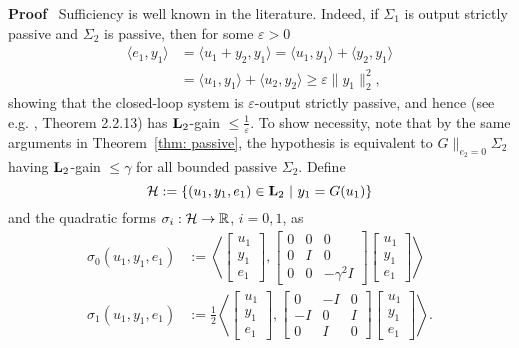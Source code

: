 \documentclass[11pt]{article}
\def\Real{\mathbb{R}} \def\Ints{\mathbb{Z}} \def\Natural{\mathbb{N}}
\newcommand{\Ltwo}{\boldsymbol{\rm L}_{2}}
\begin{document}
\noindent
{\bf Proof} \,
Sufficiency is well known in the literature. Indeed, if $\Sigma_1$ is output strictly passive and $\Sigma_2$ is passive, then for some $\varepsilon > 0$
 \begin{align*}
 \langle e_1, y_1 \rangle & = \langle u_1 + y_2, y_1 \rangle = \langle u_1, y_1 \rangle + \langle y_2, y_1 \rangle \\
 & = \langle u_1, y_1 \rangle + \langle u_2, y_2 \rangle \geq \varepsilon \| y_1\|_2^2,
 \end{align*}
 showing that the closed-loop system is $\varepsilon$-output strictly passive, and hence (see e.g. \cite{Sch17}, Theorem 2.2.13) has $\Ltwo$-gain $\leq \frac{1}{\varepsilon}$. 
To show necessity, note that by the same arguments in Theorem~\ref{thm: passive}, the hypothesis is equivalent
to $G \|_{e_2=0} \Sigma_2$ having $\Ltwo$-gain $\leq \gamma$ for all bounded  passive $\Sigma_2$. Define
\[
\HH := \{(u_1, y_1, e_1) \in \Ltwo\ |\ y_1 = G (u_1)\}
\]
and the quadratic forms $\sigma_i : \HH
\to \Real$, $i = 0, 1$, as 
\begin{align*}
 \sigma_0(u_1, y_1, e_1) & := \left\langle 
\begin{bmatrix} 
 u_1 \\
 y_1 \\
 e_1 
\end{bmatrix},
\begin{bmatrix}
0 & 0 & 0  \\
0 & I & 0  \\
0 & 0 & -\gamma^2 I 
\end{bmatrix}
\begin{bmatrix} 
 u_1 \\
 y_1 \\
 e_1 
\end{bmatrix}
\right\rangle \\
 \sigma_1(u_1, y_1, e_1) & := \frac{1}{2} \left\langle 
\begin{bmatrix} 
 u_1 \\
 y_1 \\
 e_1 
\end{bmatrix},
\begin{bmatrix}
0 & -I & 0 \\
-I & 0 & I \\
0 & I &0  
\end{bmatrix}
\begin{bmatrix} 
 u_1 \\
 y_1 \\
 e_1 
\end{bmatrix}
\right\rangle.
\end{align*}
\end{document}
